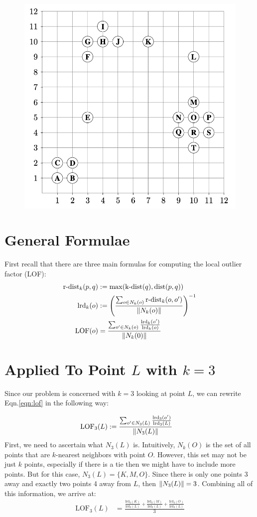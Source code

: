 \documentclass[a4paper,12pt]{article}
\theoremstyle{definition}
\theoremstyle{remark}
\newcommand{\rdist}{\text{r-dist}}
\newcommand{\kdist}{\text{k-dist}}
\newcommand{\dist}{\text{dist}}
\newcommand{\lrd}{\text{lrd}}
\newcommand{\lof}{\text{LOF}}
\begin{document}
	\begin{figure}[h!]
		\centering
		\includegraphics[width=0.7\linewidth]{"GraphForProblem"}
		\caption{}
		\label{fig:graphforproblem}
	\end{figure}
	
\section*{General Formulae}
First recall that there are three main formulas for computing the local outlier factor (LOF):
\begin{align}
	\rdist_k(p,q) &:= \max(\kdist(q), \dist(p,q))\label{eqn:rdist}\\
	\lrd_k(o) &:=\left(\frac{\sum_{o\in N_k(o)}\rdist_k(o,o')}{\norm{N_k(o)}}\right)^{-1}\label{eqn:lrd}\\
	\lof(o) &= \frac{\sum_{o'\in N_k(o)}\frac{\lrd_k(o')}{\lrd_k(o)}}{\norm{N_k(0)}}\label{eqn:lof}
\end{align}

\section*{Applied To Point $L$ with $k=3$}
Since our problem is concerned with $k=3$ looking at point $L$, we can rewrite Eqn.\ref{eqn:lof} in the following way:

\begin{align*}
	\lof_3(L) &:=\frac{\sum_{o'\in N_3(L)}\frac{\lrd_3(o')}{\lrd_3(L)}}{\norm{N_3(L)}}
\end{align*}
First, we need to ascertain what $N_3(L)$ is. Intuitively, $N_k(O)$ is the set of all points that are $k$-nearest neighbors with point $O$. However, this set may not be just $k$ points, especially if there is a tie then we might have to include more points. But for this case, $N_3(L) = \{K, M, O\}$. Since there is only one points 3 away and exactly two points 4 away from $L$, then $\norm{N_3(L)} = 3$. Combining all of this information, we arrive at: 
\begin{align*}
		\lof_3(L) &= \frac{\frac{\lrd_3(K)}{\lrd_3(L)} + \frac{\lrd_3(M)}{\lrd_3(L)} + \frac{\lrd_3(O)}{\lrd_3(L)}}{3}\label{eqn:lor_mod}
\end{align*}
\end{document}
